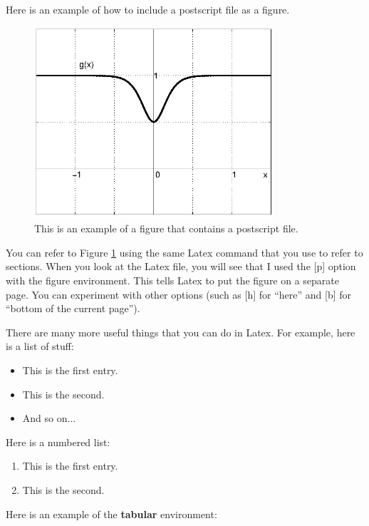 \documentclass[10pt]{article}
\begin{document}
Here is an example of how to include a postscript file as a figure.
\begin{figure}[p]
\centerline{\includegraphics[width=3.5in]{myfile.jpg}}
\caption{This is an example of a figure that contains a postscript file.}
\label{FIG}
\end{figure}
You can refer to Figure \ref{FIG} using the same Latex command
that you use to refer to sections.
When you look at the Latex file, you will see that I used the
[p] option with the figure environment.  This tells Latex to
put the figure on a separate page.
You can experiment with other options (such as [h] for ``here''
and [b] for ``bottom of the current page'').

There are many more useful things that you can do in Latex.  For example,
here is a list of stuff:
\begin{itemize}
\item This is the first entry.
\item This is the second.
\item And so on...
\end{itemize}
Here is a numbered list:
\begin{enumerate}
\item This is the first entry.
\item This is the second.
\end{enumerate}

Here is an example of the \textbf{tabular} environment:
\end{document}
